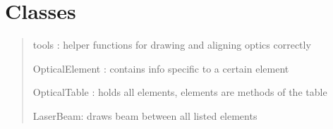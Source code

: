 \documentclass[letterpaper,10pt,english]{sphinxmanual}
\begin{document}
\section{Classes}
\label{\detokenize{index:classes}}\begin{quote}

\sphinxAtStartPar
tools : helper functions for drawing and aligning optics correctly

\sphinxAtStartPar
OpticalElement : contains info specific to a certain element

\sphinxAtStartPar
OpticalTable : holds all elements, elements are methods of the table

\sphinxAtStartPar
LaserBeam: draws beam between all listed elements
\end{quote}
\end{document}
